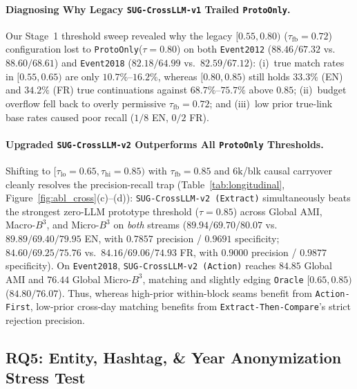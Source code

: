\paragraph{Diagnosing Why Legacy \texttt{SUG-CrossLLM-v1} Trailed \texttt{ProtoOnly}.}
Our Stage~1 threshold sweep revealed why the legacy $[0.55, 0.80)$ ($\tau_{\text{fb}}=0.72$) configuration lost to \texttt{ProtoOnly}($\tau=0.80$) on both \texttt{Event2012} ($88.46/67.32$ vs.\ $88.60/68.61$) and \texttt{Event2018} ($82.18/64.99$ vs.\ $82.59/67.12$): (i)~true match rates in $[0.55, 0.65)$ are only $10.7\%$--$16.2\%$, whereas $[0.80, 0.85)$ still holds $33.3\%$ (EN) and $34.2\%$ (FR) true continuations against $68.7\%$--$75.7\%$ above $0.85$; (ii)~budget overflow fell back to overly permissive $\tau_{\text{fb}}=0.72$; and (iii)~low prior true-link base rates caused poor recall ($1/8$ EN, $0/2$ FR).

\paragraph{Upgraded \texttt{SUG-CrossLLM-v2} Outperforms All \texttt{ProtoOnly} Thresholds.}
Shifting to $[\tau_{\text{lo}}=0.65, \tau_{\text{hi}}=0.85)$ with $\tau_{\text{fb}}=0.85$ and $6\text{k}$/blk causal carryover cleanly resolves the precision-recall trap (Table~\ref{tab:longitudinal}, Figure~\ref{fig:abl_cross}(c)--(d)): \texttt{SUG-CrossLLM-v2 (Extract)} simultaneously beats the strongest zero-LLM prototype threshold ($\tau=0.85$) across Global AMI, Macro-$B^3$, and Micro-$B^3$ on \emph{both} streams ($89.94/69.70/80.07$ vs.\ $89.89/69.40/79.95$ EN, with $0.7857$ precision / $0.9691$ specificity; $84.60/69.25/75.76$ vs.\ $84.16/69.06/74.93$ FR, with $0.9000$ precision / $0.9877$ specificity). On \texttt{Event2018}, \texttt{SUG-CrossLLM-v2 (Action)} reaches $84.85$ Global AMI and $76.44$ Global Micro-$B^3$, matching and slightly edging \texttt{Oracle} $[0.65, 0.85)$ ($84.80/76.07$). Thus, whereas high-prior within-block seams benefit from \texttt{Action-First}, low-prior cross-day matching benefits from \texttt{Extract-Then-Compare}'s strict rejection precision.

\subsection{RQ5: Entity, Hashtag, \& Year Anonymization Stress Test}
\label{sec:rq5}

